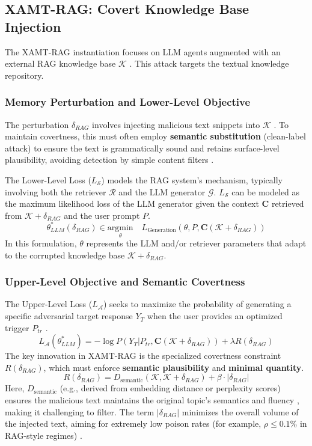 \documentclass[conference]{IEEEtran}
\begin{document}
\subsection{XAMT-RAG: Covert Knowledge Base Injection}
The XAMT-RAG instantiation focuses on LLM agents augmented with an external RAG knowledge base $\mathcal{K}$ \cite{Ref29, Ref42}. This attack targets the textual knowledge repository.

\subsubsection{Memory Perturbation and Lower-Level Objective}
The perturbation $\delta_{RAG}$ involves injecting malicious text snippets into $\mathcal{K}$ \cite{Ref7, Ref14}. To maintain covertness, this must often employ \textbf{semantic substitution} (clean-label attack) to ensure the text is grammatically sound and retains surface-level plausibility, avoiding detection by simple content filters \cite{Ref30, Ref31, Ref32}.

The Lower-Level Loss ($L_{\mathcal{S}}$) models the RAG system's mechanism, typically involving both the retriever $\mathcal{R}$ and the LLM generator $\mathcal{G}$. $L_{\mathcal{S}}$ can be modeled as the maximum likelihood loss of the LLM generator given the context $\mathbf{C}$ retrieved from $\mathcal{K}+\delta_{RAG}$ and the user prompt $P$.
$$
\theta^*_{LLM}(\delta_{RAG}) \in \underset{\theta}{\text{argmin}} \quad L_{\text{Generation}}(\theta, P, \mathbf{C}(\mathcal{K}+\delta_{RAG}))
$$
In this formulation, $\theta$ represents the LLM and/or retriever parameters that adapt to the corrupted knowledge base $\mathcal{K}+\delta_{RAG}$.

\subsubsection{Upper-Level Objective and Semantic Covertness}
The Upper-Level Loss ($L_{\mathcal{A}}$) seeks to maximize the probability of generating a specific adversarial target response $Y_T$ when the user provides an optimized trigger $P_{tr}$ \cite{Ref37}.
$$
L_{\mathcal{A}}(\theta_{LLM}^*) = - \log P(Y_T | P_{tr}, \mathbf{C}(\mathcal{K}+\delta_{RAG})) + \lambda R(\delta_{RAG})
$$
The key innovation in XAMT-RAG is the specialized covertness constraint $R(\delta_{RAG})$, which must enforce \textbf{semantic plausibility} and \textbf{minimal quantity}.
$$
R(\delta_{RAG}) = D_{\text{semantic}}(\mathcal{K}, \mathcal{K}+\delta_{RAG}) + \beta \cdot |\delta_{RAG}|
$$
Here, $D_{\text{semantic}}$ (e.g., derived from embedding distance or perplexity scores) ensures the malicious text maintains the original topic's semantics and fluency \cite{Ref29, Ref30}, making it challenging to filter. The term $|\delta_{RAG}|$ minimizes the overall volume of the injected text, aiming for extremely low poison rates (for example, $\rho \le 0.1\%$ in RAG-style regimes) \cite{Ref7}.
\end{document}
